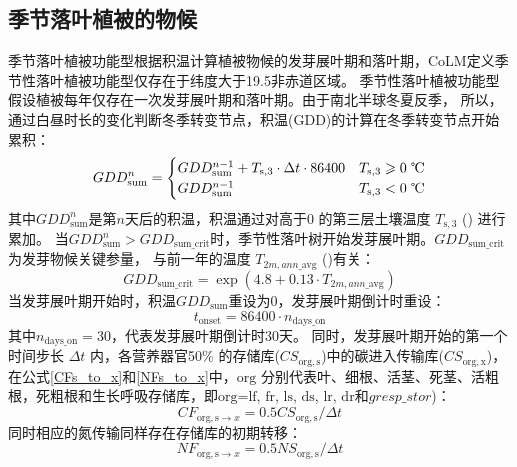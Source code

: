 \subsection{季节落叶植被的物候}\label{季节落叶植被的物候}
季节落叶植被功能型根据积温计算植被物候的发芽展叶期和落叶期，CoLM定义季节性落叶植被功能型仅存在于纬度大于19.5\textdegree 非赤道区域。
季节性落叶植被功能型假设植被每年仅存在一次发芽展叶期和落叶期。由于南北半球冬夏反季，
所以，通过白昼时长的变化判断冬季转变节点，积温(${\mathrm {GDD}}$)的计算在冬季转变节点开始累积\citep{white1997continental}：
\begin{equation}
  GDD _{\mathrm{sum}}^{n}=\begin{cases}
    GDD _{\mathrm{sum}}^{n-1}+T_{\mathrm{s, 3}} \cdot \Delta t \cdot 86400 & T_{\mathrm{s, 3}} \geqslant \text{0 \textcelsius} \\
    GDD _{\mathrm{sum}}^{n-1} & T_{\mathrm{s, 3}}< \text{0 \textcelsius}
  \end{cases}
\end{equation}
其中$GDD_{\mathrm{sum}}^n$是第$n$天后的积温，积温通过对高于0 \textcelsius 的第三层土壤温度 $T_{\mathrm{s,3}}$ (\textcelsius) 进行累加。
当$GDD_{\mathrm{sum}}^n>{GDD}_{\mathrm{sum\_{crit}}}$时，季节性落叶树开始发芽展叶期。${GDD}_{\mathrm{sum\_{crit}}}$ 为发芽物候关键参量，
与前一年的温度 $T_{2m,ann\_{\mathrm{avg}}}$ (\textcelsius)有关：
\begin{equation}
  GDD _{\mathrm{sum\_{crit}}}=\exp \left(4.8+0.13 \cdot T_{2 m, ann\_{\mathrm{avg}}}\right)
\end{equation}
当发芽展叶期开始时，积温${GDD}_{\mathrm{sum}}$重设为0，发芽展叶期倒计时重设：
\begin{equation}
  t_{\mathrm{onset}}=86400 \cdot n_{\mathrm{days\_on}}
\end{equation}
其中$n_{\mathrm{days\_on}}=30$，代表发芽展叶期倒计时30天。
同时，发芽展叶期开始的第一个时间步长 $\Delta t$ 内，各营养器官50\% 的存储库($CS_{\mathrm{org,{s}}}$)中的碳进入传输库($CS_{\mathrm{org,{x}}}$)，在公式\eqref{CFs_to_x}和\eqref{NFs_to_x}中，${\mathrm {org}}$ 分别代表叶、细根、活茎、死茎、活粗根，死粗根和生长呼吸存储库，即$\text{org=lf}$, ${\mathrm {fr}}$, ${\mathrm {ls}}$, ${\mathrm {ds}}$, ${\mathrm {lr}}$, ${\mathrm {dr}}$和$gresp\_stor$)：
\begin{equation}\label{CFs_to_x}
  CF_{\mathrm{org,{s}}\rightarrow {x}} = 0.5 CS_{\mathrm{org,{s}}}/\Delta t
\end{equation}
同时相应的氮传输同样存在存储库的初期转移：
\begin{equation}\label{NFs_to_x}
  NF_{\mathrm{org,{s}}\rightarrow {x}} = 0.5  NS_{\mathrm{org,{s}}}/\Delta t
\end{equation}

